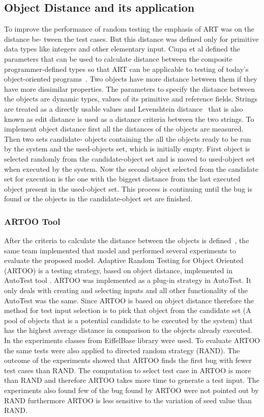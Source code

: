 {\subsection{Object Distance and its application}
To improve the performance of random testing the emphasis of ART was on the distance be- tween the test cases. But this distance was defined only for primitive data types like integers and other elementary input. Ciupa et al defined the parameters that can be used to calculate distance between the composite programmer-defined types so that ART can be applicable to testing of today’s object-oriented programs~\cite{Ciupa2006}. Two objects have more distance between them if they have more dissimilar properties. The parameters to specify the distance between the objects are dynamic types, values of its primitive and reference fields. Strings are treated as a directly usable values and Levenshtein distance~\cite{Levenshtein1966} that is also known as edit distance is used as a distance criteria between the two strings. To implement object distance first all the distances of the objects are measured. Then two sets candidate- objects containing the all the objects ready to be run by the system and the used-objects set, which is initially empty. First object is selected randomly from the candidate-object set and is moved to used-object set when executed by the system. Now the second object selected from the candidate set for execution is the one with the biggest distance from the last executed object present in the used-object set. This process is continuing until the bug is found or the objects in the candidate-object set are finished.

\subsubsection{ARTOO Tool}
After the criteria to calculate the distance between the objects is defined~\cite{Ciupa2006}, the same team implemented that model and performed several experiments to evaluate the proposed model. Adaptive Random Testing for Object Oriented (ARTOO) is a testing strategy, based on object distance, implemented in AutoTest tool \cite{16 search it Mendeley}.
ARTOO was implemented as a plug-in strategy in AutoTest. It only deals with creating and selecting inputs and all other functionality of the AutoTest was the same. Since ARTOO is based on object distance therefore the method for test input selection is to pick that object from the candidate set (A pool of objects that is a potential candidate to be executed by the system) that has the highest average distance in comparison to the objects already executed. In the experiments classes from EiffelBase library \cite{17 search it mendeley} were used. To evaluate ARTOO the same tests were also applied to directed random strategy (RAND). The outcome of the experiments showed that ARTOO finds the first bug with fewer test cases than RAND. The computation to select test case in ARTOO is more than RAND and therefore ARTOO takes more time to generate a test input. The experiments also found few of the bug found by ARTOO were not pointed out by RAND furthermore ARTOO is less sensitive to the variation of seed value than RAND.

}
